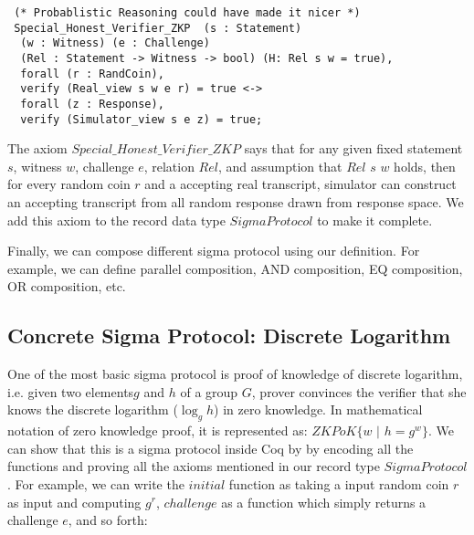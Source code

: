 \begin{verbatim}
 (* Probablistic Reasoning could have made it nicer *)
 Special_Honest_Verifier_ZKP  (s : Statement) 
  (w : Witness) (e : Challenge) 
  (Rel : Statement -> Witness -> bool) (H: Rel s w = true),
  forall (r : RandCoin), 
  verify (Real_view s w e r) = true <->
  forall (z : Response), 
  verify (Simulator_view s e z) = true;

\end{verbatim}

The axiom $Special\_Honest\_Verifier\_ZKP$ says that for any  given 
fixed statement $s$, witness $w$, challenge $e$, relation $Rel$, and assumption that $Rel$ $s$ $w$ holds, 
then for every random coin $r$  and a accepting real transcript, simulator can construct 
an accepting transcript from all random response drawn from response space. 
We add this axiom to the record data type $SigmaProtocol$ to make it 
complete. 

Finally, we can compose different  
sigma protocol using our definition. For example, 
we can define parallel composition, AND composition,
EQ composition, OR composition, etc.

\subsection{Concrete Sigma Protocol: Discrete Logarithm}
\label{sec:conc_sigma}
One of the most basic sigma protocol is proof of knowledge of 
discrete logarithm, i.e. given two elements$g$ and $h$ of 
a group $G$, prover convinces the verifier that 
she knows the discrete logarithm ($\log_g h$) in zero 
knowledge. In mathematical 
notation of zero knowledge proof, it is represented as:
$ZKPoK \lbrace w \text{ | } h = g^w \rbrace$. We can show 
that this is a sigma protocol inside Coq by 
by encoding all the  functions 
and proving all the axioms mentioned in 
our record type $SigmaProtocol$.  For example,
 we can write the $initial$ function as taking a input 
random coin $r$ as input and computing 
$g^r$, $challenge$ as a function which simply returns 
a challenge $e$, and so forth: 


\begin{displayquote}

$\text{initial r := } g^r}$  

$\text{challenge := } e$

$\text{response h w r e := } r + e \cdot w$

$\text{verify h a e z  := } g^z = a \cdot h^e$

$\text{simulator s e z := } (g^z \cdot h^{-e}, e, z)$

$\text{extractor }  $c_{1}$ $z_{1}$ $c_{2}$ $z_{2}$ := (z_{1} - z_{2}) \cdot (c_{2} - c_{1})^{-1}$

\end{displayquote}

